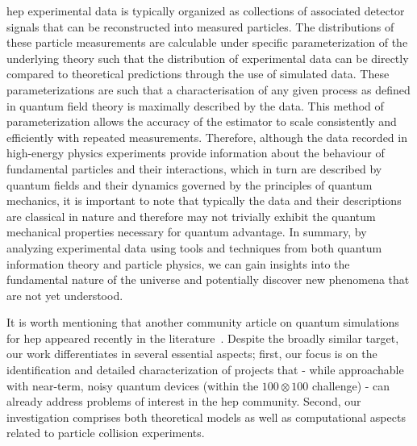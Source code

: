 \gls{hep} experimental data is typically organized as collections of associated detector signals that can be reconstructed into measured particles. The distributions of these particle measurements are calculable under specific parameterization of the underlying theory such that the distribution of experimental data can be directly compared to theoretical predictions through the use of simulated data.
These parameterizations are such that a characterisation of any given process as defined in quantum field theory is maximally described by the data. 
This method of parameterization allows the accuracy of the estimator to scale consistently and efficiently with repeated measurements.
Therefore, although the data recorded in high-energy physics experiments provide information about the behaviour of fundamental particles and their interactions, which in turn are described by quantum fields and their dynamics governed by the principles of quantum mechanics, it is important to note that typically the data and their descriptions are classical in nature and therefore may not trivially exhibit the quantum mechanical properties necessary for quantum advantage. 
In summary, by analyzing experimental data using tools and techniques from both quantum information theory and particle physics, we can gain insights into the fundamental nature of the universe and potentially discover new phenomena that are not yet understood.

It is worth mentioning that another community article on quantum simulations for \gls{hep} appeared recently in the literature~\cite{PRXQuantum.4.027001}. 
Despite the broadly similar target, our work differentiates in several essential aspects; first, our focus is on the identification and detailed characterization of projects that - while approachable with near-term, noisy quantum devices (within the $100 \otimes 100$ challenge) -  can already address problems of interest in the \gls{hep} community. Second, our investigation comprises both theoretical models as well as computational aspects related to particle collision experiments.

